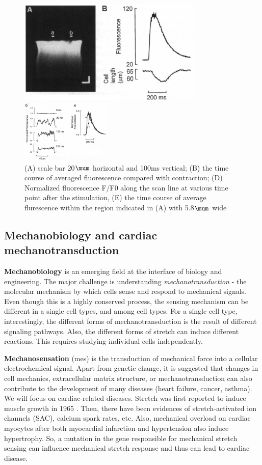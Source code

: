 \begin{figure}[hbt]
  \centerline{\includegraphics[height=5cm,
    angle=0]{./images/global_transient_cannell1994.eps}}
      \centerline{\includegraphics[height=3cm,
    angle=0]{./images/global_transient_normalized_cannell1994.eps}}
  \caption{(A) scale bar 20$\mum$ horizontal and 100ms vertical; (B) the time
  course of averaged fluorescence compared with contraction; (D) Normalized
  fluorescence F/F0 along the scan line at various time point after the
  stimulation, (E) the time course of average flurescence within the region
  indicated in (A) with 5.8$\mum$ wide}
  \label{fig:global-transient_cannell1994}
\end{figure}

\subsection{Mechanobiology and cardiac mechanotransduction}

{\bf Mechanobiology} is an emerging field at the interface of biology and
engineering. The major challenge is understanding {\it mechanotransduction} -
the molecular mechanism by which cells sense and respond to mechanical signals.
Even though this is a highly conserved process, the sensing mechanism can be
different in a single cell types, and among cell types. For a single cell type,
interestingly, the different forms of mechanotransduction is the result of
different signaling pathways. Also, the different forms of stretch can induce
different reactions. This requires studying individual cells independently.

{\bf Mechanosensation} (mes) is the transduction of mechanical force into a
cellular electrochemical signal. Apart from genetic change, it is suggested that
changes in cell mechanics, extracellular matrix structure, or
mechanotransduction can also contribute to the development of many diseases
(heart failure, cancer, asthma). We will focus on cardiac-related diseases.
Stretch was first reported to induce muscle growth in 1965 \citep{csapo1965}.
Then, there have been evidences of stretch-activated ion channels (SAC), calcium
spark rates, etc. Also, mechanical overload on cardiac myocytes after both
myocardial infarction and hypertension also induce hypertrophy. So, a mutation
in the gene responsible for mechanical stretch sensing can influence mechanical
stretch response and thus can lead to cardiac disease.

